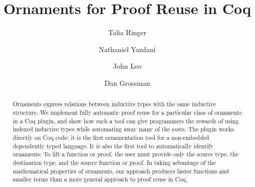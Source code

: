 \documentclass[a4paper,USenglish,cleveref, autoref]{lipics-v2019}
\title{Ornaments for Proof Reuse in Coq}
\author{Talia Ringer}{University of Washington, USA}{tringer@cs.washington.edu}{}{}
\author{Nathaniel Yazdani}{University of Washington, USA}{nyazdani@cs.washington.edu}{}{}
\author{John Leo}{Halfaya Research}{leo@halfaya.org}{}{}
\author{Dan Grossman}{University of Washington, USA}{djg@cs.washington.edu}{}{}
\begin{document}
\newcommand\defeq{\equiv_{\scaleto{\beta\delta\iota}{4pt}}} %
\newcommand{\smallmath}[1]{$\text{\small #1}$} %
\newcommand\A{\smallmath{$A$}} %
\newcommand\B{\smallmath{$B$}} %
\newcommand\IB{\smallmath{$I_B$}} %
\newcommand\sigT{\smallmath{$\Sigma$}} %
\newcommand\exT{\smallmath{$\exists$}} %
\newcommand\Pil{\smallmath{$\pi_l$}} %
\newcommand\Pir{\smallmath{$\pi_r$}} %
\newcommand\toolname{\textsc{Devoid}\xspace} %
\newcommand{\reducedstrut}{\vrule width 0pt height .9\ht\strutbox depth .9\dp\strutbox\relax} %
\newcommand{\codediff}[1]{%
  \begingroup
  \setlength{\fboxsep}{0pt}%
  \colorbox{orange!25}{\reducedstrut#1\/}%
  \endgroup
} %
\newcommand{\codeauto}[1]{%
  \begingroup
  \setlength{\fboxsep}{0pt}%
  \colorbox{cyan!30}{\reducedstrut#1\/}%
  \endgroup
} %

\maketitle

\begin{abstract}
Ornaments express relations between inductive types with the same inductive structure.
We implement fully automatic proof reuse for a particular class of ornaments in a Coq plugin,
and show how such a tool can give programmers the rewards of using indexed inductive types
while automating away many of the costs.
The plugin works directly on Coq code; it is the first ornamentation tool for a
non-embedded dependently typed language.
It is also the first tool to automatically identify ornaments:
To lift a function or proof,
the user must provide only the source type, the destination type, and the source function or proof.
In taking advantage of the mathematical properties of ornaments, our approach produces faster functions and smaller terms 
than a more general approach to proof reuse in Coq.
\end{abstract}




















\end{document}
